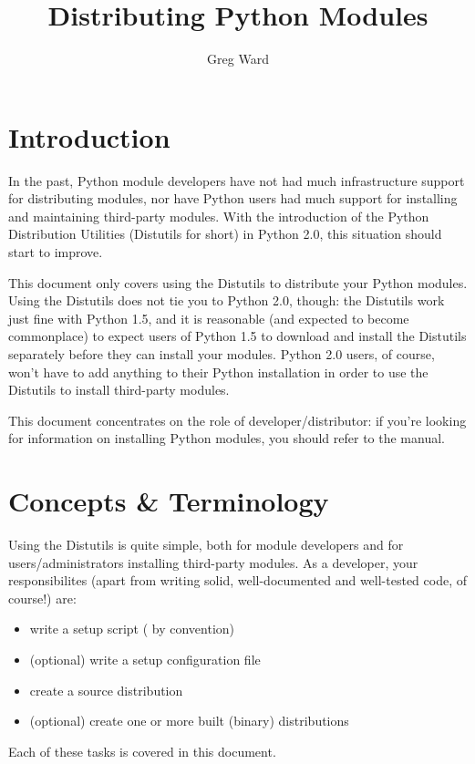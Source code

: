 \documentclass{howto}
\title{Distributing Python Modules}
\author{Greg Ward}
\begin{document}
\maketitle
\tableofcontents

\section{Introduction}
\label{intro}

In the past, Python module developers have not had much infrastructure
support for distributing modules, nor have Python users had much support
for installing and maintaining third-party modules.  With the
introduction of the Python Distribution Utilities (Distutils for short)
in Python 2.0, this situation should start to improve.

This document only covers using the Distutils to distribute your Python
modules.  Using the Distutils does not tie you to Python 2.0, though:
the Distutils work just fine with Python 1.5, and it is reasonable (and
expected to become commonplace) to expect users of Python 1.5 to
download and install the Distutils separately before they can install
your modules.  Python 2.0 users, of course, won't have to add anything
to their Python installation in order to use the Distutils to install
third-party modules.

This document concentrates on the role of developer/distributor: if
you're looking for information on installing Python modules, you
should refer to the  manual.


\section{Concepts \& Terminology}
\label{concepts}

Using the Distutils is quite simple, both for module developers and for
users/administrators installing third-party modules.  As a developer,
your responsibilites (apart from writing solid, well-documented and
well-tested code, of course!) are:
\begin{itemize}
\item write a setup script ( by convention)
\item (optional) write a setup configuration file
\item create a source distribution
\item (optional) create one or more built (binary) distributions
\end{itemize}
Each of these tasks is covered in this document.
\end{document}
